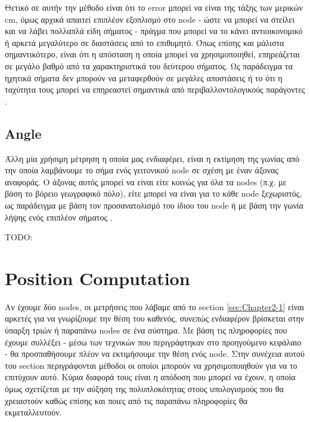 Θετικό σε αυτήν την μέθοδο είναι ότι το error μπορεί να είναι της τάξης των μερικών cm, όμως αρχικά απαιτεί επιπλέον εξοπλισμό στο node -
ώστε να μπορεί να στείλει και να λάβει πολλαπλά είδη σήματος - πράγμα που μπορεί να το κάνει αντιοικονομικό ή αρκετά μεγαλύτερο σε διαστάσεις από 
το επιθυμητό. Όπως επίσης και μάλιστα  
σημαντικότερο, είναι ότι η απόσταση η οποία μπορεί να 
χρησιμοποιηθεί, επηρεάζεται σε μεγάλο βαθμό από τα χαρακτηριστικά του δεύτερου σήματος. Ως παράδειγμα τα ηχητικά σήματα 
δεν μπορούν να μεταφερθούν σε μεγάλες αποστάσεις ή το ότι η ταχύτητα τους μπορεί να επηρεαστεί σημαντικά από περιβαλλοντολογικούς παράγοντες
\cite{farooqiazam2016location}.




\subsection{Angle}\label{sec:Chapter2-1-1}
Άλλη μία χρήσιμη μέτρηση η οποία μας ενδιαφέρει, είναι η εκτίμηση της γωνίας από την οποία λαμβάνουμε το σήμα ενός γειτονικού
node σε σχέση με έναν άξονας αναφοράς. Ο άξονας αυτός μπορεί να είναι είτε κοινώς για όλα τα nodes (π.χ. με βάση το βόρειο γεωγραφικό πόλο),
είτε μπορεί να είναι για το κάθε node ξεχωριστός, ως παράδειγμα με βάση τον προσανατολισμό του ίδιου του node ή με βάση την γωνία λήψης ενός 
επιπλέον σήματος \cite{wsn-Localization-systems}. 

TODO: 

\section{Position Computation} \label{sec:Chapter2-2} 
Αν έχουμε δύο nodes, οι μετρήσεις που λάβαμε από το section \ref{sec:Chapter2-1} είναι αρκετές για να γνωρίζουμε την θέση του καθενός,
συνεπώς ενδιαφέρον βρίσκεται στην ύπαρξη τριών ή παραπάνω nodes σε ένα σύστημα. Με βάση τις πληροφορίες που έχουμε συλλέξει - μέσω των τεχνικών που 
περιγράφτηκαν στο προηγούμενο κεφάλαιο - θα προσπαθήσουμε πλέον να εκτιμήσουμε την θέση ενός node. Στην συνέχεια αυτού του section περιγράφονται μέθοδοι οι οποίοι μπορούν να χρησιμοποιηθούν για να το επιτύχουν
αυτό. Κύρια διαφορά τους είναι η απόδοση που μπορεί να έχουν, η οποία όμως σχετίζεται με την αύξηση της πολυπλοκότητας στους υπολογισμούς που θα
χρειαστούν καθώς επίσης και ποιες από τις παραπάνω πληροφορίες θα εκμεταλλευτούν. 

